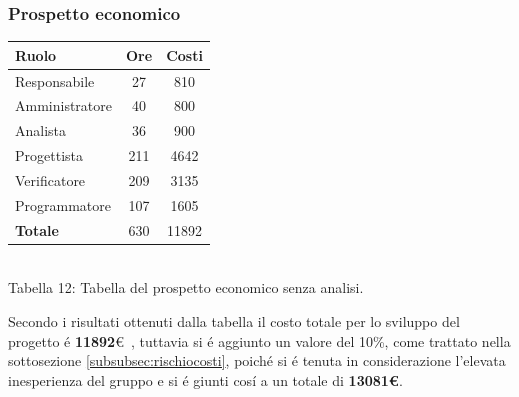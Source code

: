 \subsubsection{Prospetto economico}
\begin{center}
\begin{tabular}{| l | c | c |}
\hline
Ruolo & Ore & Costi \\
\hline
Responsabile & 27 & 810 \\
Amministratore & 40 & 800 \\
Analista & 36 & 900\\
Progettista & 211 & 4642 \\
Verificatore & 209 & 3135 \\
Programmatore & 107 & 1605 \\
\hline
\textbf{Totale} & 630 & 11892 \\
\hline
\end{tabular}
\\
Tabella 12: Tabella del prospetto economico senza analisi.
\end{center}
Secondo i risultati ottenuti dalla tabella il costo totale per lo sviluppo del progetto \'e \textbf{11892}\euro~, tuttavia si \'e aggiunto un valore del 10\%, come trattato nella sottosezione \ref{subsubsec:rischiocosti}, poich\'e si \'e tenuta in considerazione l'elevata inesperienza del gruppo e si \'e giunti cos\'i a un totale di \textbf{13081\euro}.